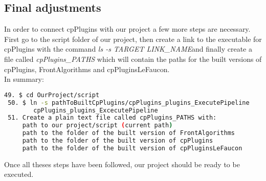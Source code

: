\documentclass[12pt]{article}
\begin{document}
\subsection{Final adjustments}

In order to connect cpPlugins with our project a few more steps are necessary. First go to the script
folder of our project, then create a link to the executable for cpPlugins with the command 
\textit{ls -s TARGET LINK\_NAME}and finally create a file called \textit{cpPlugins\_PATHS} which will
contain the paths for the built versions of cpPlugins, FrontAlgorithms and cpPluginsLeFaucon.\\

In summary:\\

\noindent
\small
\begin{lstlisting}[language=bash]
 49. $ cd OurProject/script
 50. $ ln -s pathToBuiltCpPlugins/cpPlugins_plugins_ExecutePipeline 
        cpPlugins_plugins_ExcecutePipeline
 51. Create a plain text file called cpPlugins_PATHS with:
     path to our project/script (current path)
     path to the folder of the built version of FrontAlgorithms
     path to the folder of the built version of cpPlugins
     path to the folder of the built version of cpPluginsLeFaucon
\end{lstlisting}

Once all theses steps have been followed, our project should be ready to be executed.



\normalsize
\end{document}
